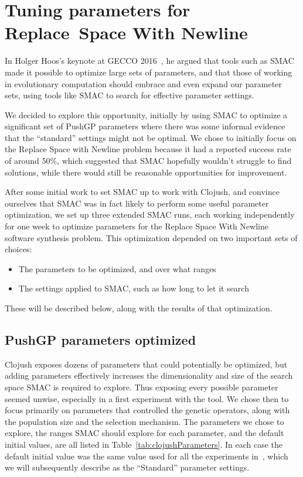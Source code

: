 \section{Tuning parameters for Replace~Space With Newline}
\label{sec:tuningRSWN}

In Holger Hoos's keynote at GECCO 
2016~\cite{Hoos:2016:TCM:2908812.2908960}, he argued that tools such as
SMAC made it possible to optimize large sets of parameters, and that those
of working in evolutionary computation should embrace and even expand
our parameter sets, using tools like SMAC to search for effective parameter
settings.

We decided to explore this opportunity, initially by using SMAC to optimize
a significant set of PushGP parameters where there was some informal
evidence that the ``standard'' settings might not be optimal. We chose to
initially focus on the Replace Space with Newline problem because it had a
reported success rate of around 50\%, which suggested that SMAC hopefully
wouldn't struggle to find solutions, while there would still be reasonable
opportunities for improvement.

After some initial work to set SMAC up to work with Clojush, and convince
ourselves that SMAC was in fact likely to perform some useful parameter
optimization, we set up three extended SMAC runs, each working independently
for one week to optimize parameters for the Replace Space With Newline software synthesis problem.
This optimization depended on two important sets of choices:
\begin{itemize}
	\item The parameters to be optimized, and over what ranges
	\item The settings applied to SMAC, such as how long to let it search
\end{itemize}
These will be described below, along with the results of that optimization.

\subsection{PushGP parameters optimized}
\label{sec:parametersOptimized}

Clojush exposes dozens of parameters that could potentially be optimized, but
adding parameters effectively increases the dimensionality and size of the
search space SMAC is required to explore. Thus exposing every possible parameter
seemed unwise, especially in a first experiment with the tool. We chose then
to focus primarily on parameters that controlled the genetic operators, along
with the population size and the selection mechanism. The parameters we chose 
to explore, the ranges SMAC should explore for each parameter, and the 
default initial values, are all listed in Table~\ref{tab:clojushParameters}.
In each case the default initial value was the same value used for all the
experiments in~\cite{Helmuth:2015:GECCO}, which we will subsequently
describe as the ``Standard'' parameter settings.

